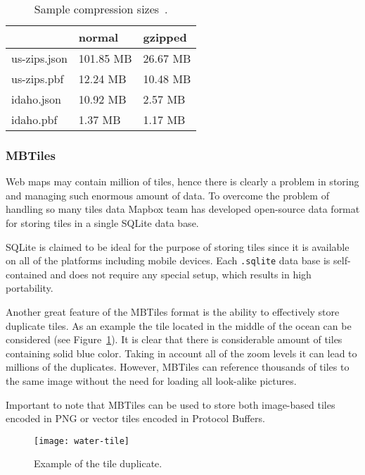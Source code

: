 \begin{table}[ht]
  \renewcommand{\arraystretch}{1.5}
  \centering
  \begin{tabular}{l l l}
    \hline
    & \textbf{normal} & \textbf{gzipped} \\
    \hline
    us-zips.json & 101.85 MB & 26.67 MB \\
    us-zips.pbf & 12.24 MB & 10.48 MB \\
    idaho.json & 10.92 MB & 2.57 MB \\
    idaho.pbf & 1.37 MB & 1.17 MB \\
    \hline
  \end{tabular}

  \caption{Sample compression sizes~\cite{geobuf}.}
  \label{tab:geobuf}
\end{table}

\subsubsection{MBTiles}

Web maps may contain million of tiles, hence there is clearly a problem in storing and managing such
enormous amount of data. To overcome the problem of handling so many tiles data Mapbox team has
developed open-source data format for storing tiles in a single SQLite data base.

SQLite is claimed to be ideal for the purpose of storing tiles since it is available on all of the
platforms including mobile devices. Each \texttt{.sqlite} data base is self-contained and does not
require any special setup, which results in high portability.

Another great feature of the MBTiles format is the ability to effectively store duplicate tiles. As
an example the tile located in the middle of the ocean can be considered (see
Figure~\ref{pic:water-tile}). It is clear that there is considerable amount of tiles containing
solid blue color. Taking in account all of the zoom levels it can lead to millions of the
duplicates. However, MBTiles can reference thousands of tiles to the same image without
the need for loading all look-alike pictures.

Important to note that MBTiles can be used to store both image-based tiles encoded in PNG or
vector tiles encoded in Protocol Buffers.

\begin{figure}[htp]
  {\par\centering
  \texttt{[image: water-tile]}
  \par}
  \caption{Example of the tile duplicate.}
  \label{pic:water-tile}
\end{figure}






